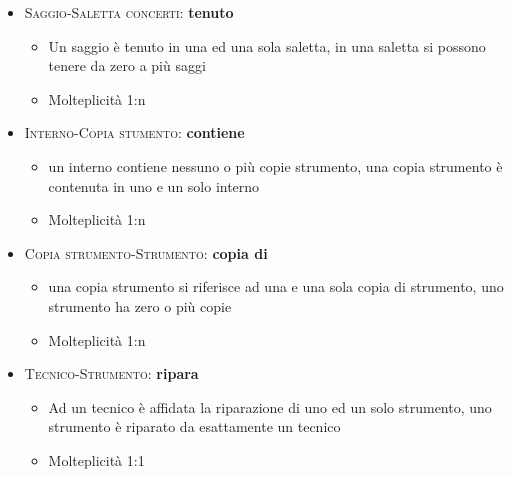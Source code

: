 \documentclass{article}
\begin{document}
\smallskip 

\begin{itemize}
\item \textsc {Saggio-Saletta concerti}: \textbf{tenuto}
	\begin{itemize}
	\item Un saggio è tenuto in una ed una sola saletta, in una saletta si possono tenere da zero a più saggi 
	\item Molteplicità 1:n
	\end{itemize}
\end{itemize}

\smallskip

\begin{itemize}
\item \textsc {Interno-Copia stumento}: \textbf{contiene}
	\begin{itemize}
	\item un interno contiene nessuno o più copie strumento, una copia strumento è contenuta in uno e un solo interno
	\item Molteplicità 1:n
	\end{itemize}
\end{itemize}

\smallskip

\begin{itemize}
\item \textsc {Copia strumento-Strumento}: \textbf{copia di}
	\begin{itemize}
	\item una copia strumento si riferisce ad una e una sola copia di strumento, uno strumento ha zero o più copie
	\item Molteplicità 1:n
	\end{itemize}
\end{itemize}

\smallskip

\begin{itemize}
\item \textsc {Tecnico-Strumento}: \textbf{ripara}
	\begin{itemize}
	\item Ad un tecnico è affidata la riparazione di uno ed un solo strumento, uno strumento è riparato da esattamente un tecnico
	\item Molteplicità 1:1
	\end{itemize}
\end{itemize}

\newpage

\thispagestyle{empty}
\end{document}
